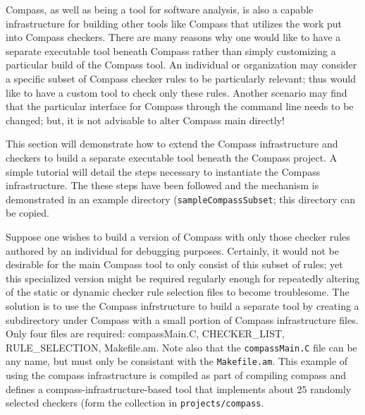 Compass, as well as being a tool for software analysis, is also a capable
infrastructure for building other tools like Compass that utilizes the work
put into Compass checkers. There are many reasons why one would like to have 
a separate executable tool beneath Compass rather than simply customizing a
particular build of the Compass tool. An individual or organization may
consider a specific subset of Compass checker rules to be particularly
relevant; thus would like to have a custom tool to check only these rules.
Another scenario may find that the particular interface for Compass through
the command line needs to be changed; but, it is not advisable to alter
Compass main directly!

This section will demonstrate how to extend the Compass
infrastructure and checkers to build a separate executable tool beneath
the Compass project. A simple tutorial will detail the steps necessary
to instantiate the Compass infrastructure. The these steps have been
followed and the mechanism is demonstrated in an example directory 
({\tt sampleCompassSubset}; this directory can be copied.

Suppose one wishes to build a version of Compass with only those checker rules
authored by an individual for debugging purposes. Certainly, it would not
be desirable for the main Compass tool to only consist of this subset of rules; yet
this specialized version might be required regularly enough for repeatedly altering
of the static or dynamic checker rule selection files to become troublesome.
The solution is to use the Compass infrstructure to build a separate tool
by creating a subdirectory under Compass with a small portion of Compass 
infrastructure files. Only four files are required: compassMain.C, CHECKER\_LIST,
RULE\_SELECTION, Makefile.am.  Note also that the {\tt compassMain.C} file
can be any name, but must only be consistant with the {\tt Makefile.am}. This
example of using the compass infrastructure is compiled as part of compiling
compass and defines a compass-infrastructure-based tool that implements
about 25 randomly selected checkers (form the collection in {\tt projects/compass}.

